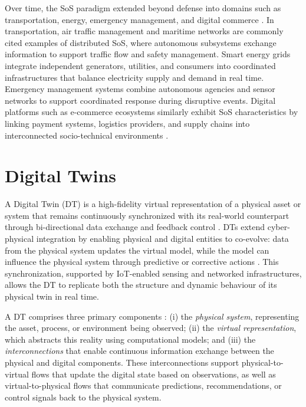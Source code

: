 Over time, the SoS paradigm extended beyond defense into domains such as transportation, energy, emergency management, and digital commerce \cite{nielsen2015systems}. In transportation, air traffic management and maritime networks are commonly cited examples of distributed SoS, where autonomous subsystems exchange information to support traffic flow and safety management. Smart energy grids integrate independent generators, utilities, and consumers into coordinated infrastructures that balance electricity supply and demand in real time. Emergency management systems combine autonomous agencies and sensor networks to support coordinated response during disruptive events. Digital platforms such as e-commerce ecosystems similarly exhibit SoS characteristics by linking payment systems, logistics providers, and supply chains into interconnected socio-technical environments \cite{nielsen2015systems}.



\section{Digital Twins}\label{sec:background-dt}
A Digital Twin (DT) is a high-fidelity virtual representation of a physical asset or system that remains continuously synchronized with its real-world counterpart through bi-directional data exchange and feedback control \cite{david2024infonomics}. DTs extend cyber-physical integration by enabling physical and digital entities to co-evolve: data from the physical system updates the virtual model, while the model can influence the physical system through predictive or corrective actions \cite{tao2018digital}. This synchronization, supported by IoT-enabled sensing and networked infrastructures, allows the DT to replicate both the structure and dynamic behaviour of its physical twin in real time.

A DT comprises three primary components \cite{vanderhorn2021digital}:
(i) the \emph{physical system}, representing the asset, process, or
environment being observed; (ii) the \emph{virtual representation},
which abstracts this reality using computational models; and (iii) the
\emph{interconnections} that enable continuous information exchange
between the physical and digital components. These interconnections support physical-to-virtual flows that update the digital state based on observations, as well as virtual-to-physical flows that communicate predictions, recommendations, or control signals back to the physical system.

